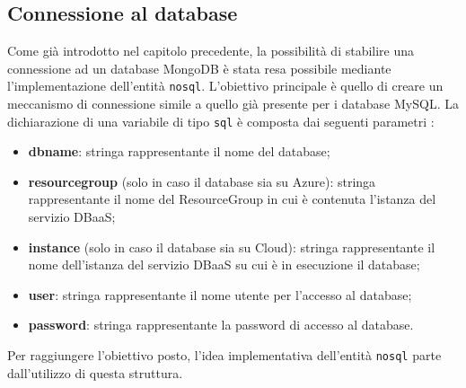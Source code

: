 \subsection{Connessione al database}
Come già introdotto nel capitolo precedente, la possibilità di stabilire una connessione ad un database MongoDB è stata resa possibile mediante l'implementazione dell'entità \verb|nosql|. L'obiettivo principale è quello di creare un meccanismo di connessione simile a quello già presente per i database MySQL. La dichiarazione di una variabile di tipo \verb|sql| è composta dai seguenti parametri \cite{giuseppe}:
\begin{itemize}
    \item \textbf{db\textunderscore name}: stringa rappresentante il nome del database;
    \item \textbf{resource\textunderscore  group} (solo in caso il database sia su Azure): stringa rappresentante il nome del ResourceGroup in cui è contenuta l’istanza del servizio DBaaS;
    \item \textbf{instance} (solo in caso il database sia su Cloud): stringa rappresentante il nome dell’istanza del servizio DBaaS su cui è in esecuzione il database;
    \item \textbf{user}: stringa rappresentante il nome utente per l’accesso al database;
    \item \textbf{password}: stringa rappresentante la password di accesso al database.
\end{itemize}
Per raggiungere l'obiettivo posto, l'idea implementativa dell'entità \verb|nosql| parte dall'utilizzo di questa struttura. \\ 

